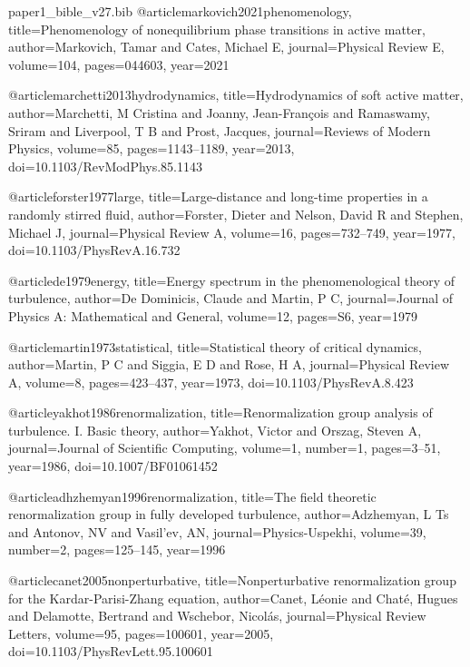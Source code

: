 \begin{filecontents}[overwrite]{paper1_bible_v27.bib}
@article{markovich2021phenomenology,
  title={Phenomenology of nonequilibrium phase transitions in active matter},
  author={Markovich, Tamar and Cates, Michael E},
  journal={Physical Review E},
  volume={104},
  pages={044603},
  year={2021}
}

@article{marchetti2013hydrodynamics,
  title={Hydrodynamics of soft active matter},
  author={Marchetti, M Cristina and Joanny, Jean-Fran\c{c}ois and Ramaswamy, Sriram and Liverpool, T B and Prost, Jacques},
  journal={Reviews of Modern Physics},
  volume={85},
  pages={1143--1189},
  year={2013},
  doi={10.1103/RevModPhys.85.1143}
}

@article{forster1977large,
  title={Large-distance and long-time properties in a randomly stirred fluid},
  author={Forster, Dieter and Nelson, David R and Stephen, Michael J},
  journal={Physical Review A},
  volume={16},
  pages={732--749},
  year={1977},
  doi={10.1103/PhysRevA.16.732}
}

@article{de1979energy,
  title={Energy spectrum in the phenomenological theory of turbulence},
  author={De Dominicis, Claude and Martin, P C},
  journal={Journal of Physics A: Mathematical and General},
  volume={12},
  pages={S6},
  year={1979}
}

@article{martin1973statistical,
  title={Statistical theory of critical dynamics},
  author={Martin, P C and Siggia, E D and Rose, H A},
  journal={Physical Review A},
  volume={8},
  pages={423--437},
  year={1973},
  doi={10.1103/PhysRevA.8.423}
}

@article{yakhot1986renormalization,
  title={Renormalization group analysis of turbulence. I. Basic theory},
  author={Yakhot, Victor and Orszag, Steven A},
  journal={Journal of Scientific Computing},
  volume={1},
  number={1},
  pages={3--51},
  year={1986},
  doi={10.1007/BF01061452}
}

@article{adhzhemyan1996renormalization,
  title={The field theoretic renormalization group in fully developed turbulence},
  author={Adzhemyan, L Ts and Antonov, NV and Vasil'ev, AN},
  journal={Physics-Uspekhi},
  volume={39},
  number={2},
  pages={125--145},
  year={1996}
}

@article{canet2005nonperturbative,
  title={Nonperturbative renormalization group for the {K}ardar-{P}arisi-{Z}hang equation},
  author={Canet, L{\'e}onie and Chat{\'e}, Hugues and Delamotte, Bertrand and Wschebor, Nicol{\'a}s},
  journal={Physical Review Letters},
  volume={95},
  pages={100601},
  year={2005},
  doi={10.1103/PhysRevLett.95.100601}
}


\end{filecontents}

